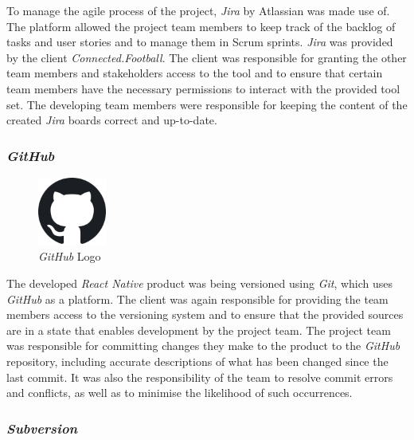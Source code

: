 To manage the agile process of the project, \textit{Jira} by Atlassian was made use of. The platform allowed the project team members to keep track of the backlog of tasks and user stories and to manage them in Scrum sprints.
\newline
\textit{Jira} was provided by the client \textit{Connected.Football}. The client was responsible for granting the other team members and stakeholders access to the tool and to ensure that certain team members have the necessary permissions to interact with the provided tool set. The developing team members were responsible for keeping the content of the created \textit{Jira} boards correct and up-to-date.

\subsubsection{\textit{GitHub}}
\label{sssec:github}

\begin{figure}[H]
    \begin{center}
        \includegraphics[width=0.2\textwidth]{images/logos/github-logo.png}
        \caption{\textit{GitHub} Logo}
        \label{fig:github_logo}
    \end{center}
\end{figure}

The developed \textit{React Native} product was being versioned using \textit{Git}, which uses \textit{GitHub} as a platform. The client was again responsible for providing the team members access to the versioning system and to ensure that the provided sources are in a state that enables development by the project team.
\newline
The project team was responsible for committing changes they make to the product to the \textit{GitHub} repository, including accurate descriptions of what has been changed since the last commit. It was also the responsibility of the team to resolve commit errors and conflicts, as well as to minimise the likelihood of such occurrences.

\subsubsection{\textit{Subversion}}
\label{sssec:subversion}

